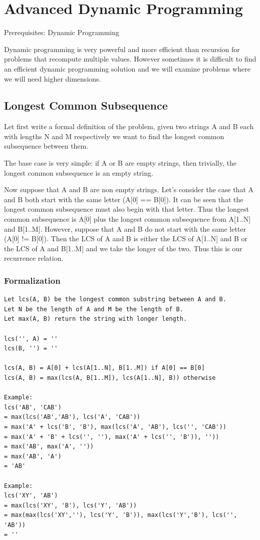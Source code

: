 \documentclass[11pt,oneside]{book}
\begin{document}
        \section{ Advanced Dynamic Programming }
        

Prerequisites: Dynamic Programming

Dynamic programming is very powerful and more efficient than recursion for problems that recompute multiple values. However sometimes it is difficult to find an efficient dynamic programming solution and we will examine problems where we will need higher dimensions.

\subsection{Longest Common Subsequence}



Let first write a formal definition of the problem, given two strings A and B each with lengths N and M respectively we want to find the longest common subsequence between them.

The base case is very simple: if A or B are empty strings, then trivially, the longest common subsequence is an empty string.

Now suppose that A and B are non empty strings. Let's consider the case that A and B both start with the same letter (A[0] == B[0]). It can be seen that the longest common subsequence must also begin with that letter. Thus the longest common subsequence is A[0] plus the longest common subsequence from A[1..N] and B[1..M]. However, suppose that A and B do not start with the same letter (A[0] != B[0]). Then the LCS of A and B is either the LCS of A[1..N] and B or the LCS of A and B[1..M] and we take the longer of the two. Thus this is our recurrence relation.

\subsubsection{Formalization}

\begin{lstlisting}
Let lcs(A, B) be the longest common substring between A and B.
Let N be the length of A and M be the length of B.
Let max(A, B) return the string with longer length.

lcs('', A) = ''
lcs(B, '') = ''

lcs(A, B) = A[0] + lcs(A[1..N], B[1..M]) if A[0] == B[0]
lcs(A, B) = max(lcs(A, B[1..M]), lcs(A[1..N], B)) otherwise

Example:
lcs('AB', 'CAB')
= max(lcs('AB','AB'), lcs('A', 'CAB'))
= max('A' + lcs('B', 'B'), max(lcs('A', 'AB'), lcs('', 'CAB'))
= max('A' + 'B' + lcs('', ''), max('A' + lcs('', 'B')), ''))
= max('AB', max('A', ''))
= max('AB', 'A')
= 'AB'

Example:
lcs('XY', 'AB')
= max(lcs('XY', 'B'), lcs('Y', 'AB'))
= max(max(lcs('XY',''), lcs('Y', 'B')), max(lcs('Y','B'), lcs('', 'AB'))
= ''
\end{lstlisting}
\end{document}
